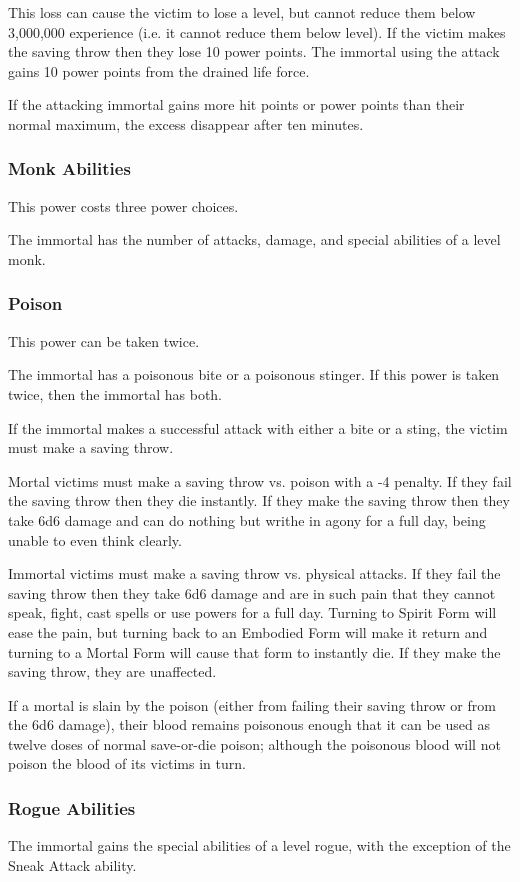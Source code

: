 \begin{multicols*}{2}
This loss can cause the victim to lose a level, but cannot reduce them below 3,000,000 experience (i.e. it cannot reduce them below  level). If the victim makes the saving throw then they lose 10 power points. The immortal using the attack gains 10 power points from the drained life force.

If the attacking immortal gains more hit points or power points than their normal maximum, the excess disappear after ten minutes.

\subsubsection{Monk Abilities}
This power costs three power choices.

The immortal has the number of attacks, damage, and special abilities of a  level monk.

\subsubsection{Poison}
This power can be taken twice.

The immortal has a poisonous bite or a poisonous stinger. If this power is taken twice, then the immortal has both.

If the immortal makes a successful attack with either a bite or a sting, the victim must make a saving throw.

Mortal victims must make a saving throw vs. poison with a -4 penalty. If they fail the saving throw then they die instantly. If they make the saving throw then they take 6d6 damage and can do nothing but writhe in agony for a full day, being unable to even think clearly.

Immortal victims must make a saving throw vs. physical attacks. If they fail the saving throw then they take 6d6 damage and are in such pain that they cannot speak, fight, cast spells or use powers for a full day. Turning to Spirit Form will ease the pain, but turning back to an Embodied Form will make it return and turning to a Mortal Form will cause that form to instantly die. If they make the saving throw, they are unaffected.

If a mortal is slain by the poison (either from failing their saving throw or from the 6d6 damage), their blood remains poisonous enough that it can be used as twelve doses of normal save-or-die poison; although the poisonous blood will not poison the blood of its victims in turn.

\subsubsection{Rogue Abilities}
The immortal gains the special abilities of a  level rogue, with the exception of the Sneak Attack ability.


\end{multicols*}
